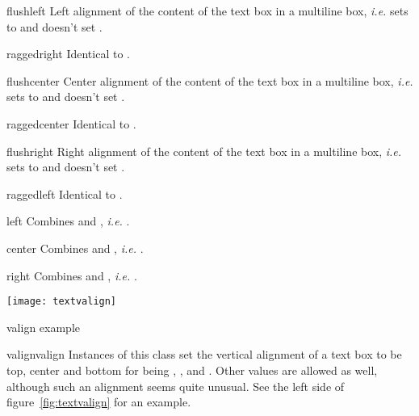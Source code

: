 \begin{memberdesc}{flushleft}
  Left alignment of the content of the text box in a multiline box,
  \emph{i.e.} sets  to  and doesn't set
  .
\end{memberdesc}

\begin{memberdesc}{raggedright}
  Identical to .
\end{memberdesc}

\begin{memberdesc}{flushcenter}
  Center alignment of the content of the text box in a multiline box,
  \emph{i.e.} sets  to  and doesn't set
  .
\end{memberdesc}

\begin{memberdesc}{raggedcenter}
  Identical to .
\end{memberdesc}

\begin{memberdesc}{flushright}
  Right alignment of the content of the text box in a multiline box,
  \emph{i.e.} sets  to  and doesn't set
  .
\end{memberdesc}

\begin{memberdesc}{raggedleft}
  Identical to .
\end{memberdesc}

\begin{memberdesc}{left}
  Combines  and , \emph{i.e.}
  .
\end{memberdesc}

\begin{memberdesc}{center}
  Combines  and , \emph{i.e.}
  .
\end{memberdesc}

\begin{memberdesc}{right}
  Combines  and , \emph{i.e.}
  .
\end{memberdesc}

\texttt{[image: textvalign]}
\centerline{valign example}

\begin{classdesc}{valign}{valign}
  Instances of this class set the vertical alignment of a text box to
  be top, center and bottom for  being ,
  , and . Other values are allowed as well, although
  such an alignment seems quite unusual. See the left side of
  figure~\ref{fig:textvalign} for an example.
\end{classdesc}

